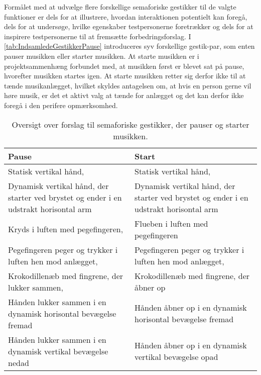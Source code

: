 Formålet med at udvælge flere forskellige semaforiske gestikker til de valgte funktioner er dels for at illustrere, hvordan interaktionen potentielt kan foregå, dels for at undersøge, hvilke egenskaber testpersonerne foretrækker og dels for at inspirere testpersonerne til at fremsætte forbedringsforslag. \blankline
%
I \autoref{tab:IndsamledeGestikkerPause} introduceres syv forskellige gestik-par, som enten pauser musikken eller starter musikken. At starte musikken er i projektsammenhæng forbundet med, at musikken først er blevet sat på pause, hvorefter musikken startes igen. At starte musikken retter sig derfor ikke til at tænde musikanlægget, hvilket skyldes antagelsen om, at hvis en person gerne vil høre musik, er det et aktivt valg at tænde for anlægget og det kan derfor ikke foregå i den perifere opmærksomhed.   
%
\begin{table}[H]
	\centering
	\begin{tabular}{| p{6cm} | p{6cm} | }
		\hline
		\textbf{Pause} & \textbf{Start} \\ \hline
		Statisk vertikal hånd, \parencite[s. 166]{PDF:ComparingInputModalities} & Statisk vertikal hånd, \parencite[s. 166]{PDF:ComparingInputModalities} \\ \hline
		Dynamisk vertikal hånd, der starter ved brystet og ender i en udstrakt horisontal arm  & Dynamisk vertikal hånd, der starter ved brystet og ender i en udstrakt horisontal arm  \\ \hline
		Kryds i luften med pegefingeren, \parencite[s. 48]{PDF:UserDefinedGesturesTV} & Flueben i luften med pegefingeren\\ \hline
		Pegefingeren peger og trykker i luften hen mod anlægget, \parencite{WEB:BeosoundMoment, WEB:Beosound2} & Pegefingeren peger og trykker i luften hen mod anlægget, \parencite[s. 48]{WEB:BeosoundMoment, WEB:Beosound2, PDF:UserDefinedGesturesTV} \\ \hline
		Krokodillenæb med fingrene, der lukker sammen, \parencite[s. 48]{PDF:UserDefinedGesturesTV} & Krokodillenæb med fingrene, der åbner op \\ \hline
		Hånden lukker sammen i en dynamisk horisontal bevægelse fremad & Hånden åbner op i en dynamisk horisontal bevægelse fremad \\ \hline
		Hånden lukker sammen i en dynamisk vertikal bevægelse nedad & Hånden åbner op i en dynamisk vertikal bevægelse opad  \\ \hline
	\end{tabular}
	\caption{Oversigt over forslag til semaforiske gestikker, der pauser og starter musikken.}
	\label{tab:IndsamledeGestikkerPause}
\end{table}
